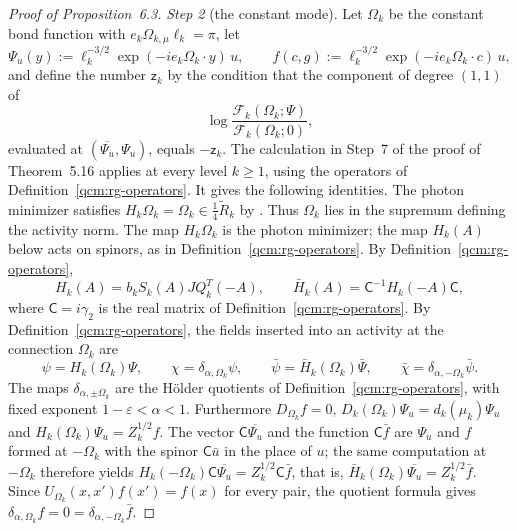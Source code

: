 \documentclass[11pt,letterpaper,reqno]{amsart}
\theoremstyle{definition}
\begin{document}
\begin{proof}[Proof of Proposition~6.3]
\emph{Step 2} (the constant mode).
Let $\Omega_k$ be the constant bond function with $e_k\Omega_{k,\mu}\ell_k=\pi$, let
\begin{equation*}
\Psi_u(y):=\ell_k^{-3/2}\exp(-ie_k\Omega_k\cdot y)\,u,\qquad f(c,g):=\ell_k^{-3/2}\exp(-ie_k\Omega_k\cdot c)\,u,
\end{equation*}
and define the number $\mathsf z_k$ by the condition that the component of degree $(1,1)$ of
\begin{equation*}
\log\frac{\mathscr F_k(\Omega_k;\Psi)}{\mathscr F_k(\Omega_k;0)},
\end{equation*}
evaluated at $(\overline{\Psi_u},\Psi_u)$, equals $-\mathsf z_k$.
The calculation in Step~7 of the proof of Theorem~5.16 applies at every level $k\ge1$, using the operators of Definition~\ref{qcm:rg-operators}. It gives the following identities.
The photon minimizer satisfies $H_k\Omega_k=\Omega_k\in\frac14\widetilde R_k$ by \cite[Propositions~10.1 and~10.4]{QEDConstruction}. Thus $\Omega_k$ lies in the supremum defining the activity norm. The map $H_k\Omega_k$ is the photon minimizer; the map $H_k(A)$ below acts on spinors, as in Definition~\ref{qcm:rg-operators}.
By Definition~\ref{qcm:rg-operators},
\begin{equation*}
H_k(A)=b_kS_k(A)JQ_k^T(-A),\qquad\bar H_k(A)=\mathsf C^{-1}H_k(-A)\mathsf C,
\end{equation*}
where $\mathsf C=i\gamma_2$ is the real matrix of Definition~\ref{qcm:rg-operators}.
By Definition~\ref{qcm:rg-operators}, the fields inserted into an activity at the connection $\Omega_k$ are
\begin{equation*}
\psi=H_k(\Omega_k)\Psi,\qquad\chi=\delta_{\alpha,\Omega_k}\psi,\qquad\bar\psi=\bar H_k(\Omega_k)\bar\Psi,\qquad\bar\chi=\delta_{\alpha,-\Omega_k}\bar\psi .
\end{equation*}
The maps $\delta_{\alpha,\pm\Omega_k}$ are the H\"older quotients of Definition~\ref{qcm:rg-operators}, with fixed exponent $1-\varepsilon<\alpha<1$.
Furthermore $D_{\Omega_k}f=0$, $D_k(\Omega_k)\Psi_u=d_k(\mu_k)\Psi_u$ and $H_k(\Omega_k)\Psi_u=Z_k^{1/2}f$.
The vector $\mathsf C\overline{\Psi_u}$ and the function $\mathsf C\bar f$ are $\Psi_u$ and $f$ formed at $-\Omega_k$ with the spinor $\mathsf C\bar u$ in the place of $u$;
the same computation at $-\Omega_k$ therefore yields $H_k(-\Omega_k)\mathsf C\overline{\Psi_u}=\allowbreak Z_k^{1/2}\mathsf C\bar f$, that is, $\bar H_k(\Omega_k)\overline{\Psi_u}=Z_k^{1/2}\bar f$.
Since $U_{\Omega_k}(x,x')f(x')=f(x)$ for every pair, the quotient formula gives $\delta_{\alpha,\Omega_k}f=0=\delta_{\alpha,-\Omega_k}\bar f$.

\end{proof}
\end{document}
